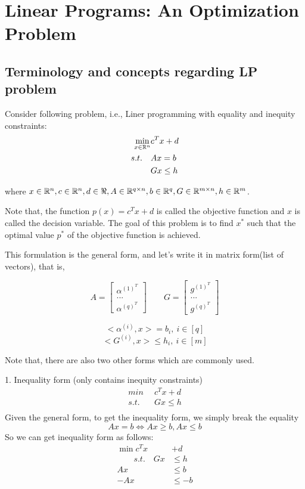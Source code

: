 
\section{Linear Programs: An Optimization Problem}
\subsection{Terminology and concepts regarding LP problem}
Consider following problem, i.e., Liner programming with equality and inequity constraints:
\begin{align*}
	\min_{x\in \mathbb{R}^n}& c^Tx + d\\
	s.t. \quad &Ax = b\\
	&Gx \leq h
\end{align*}

where $x\in \mathbb{R}^n, c\in \mathbb{R}^n, d\in \Re, A\in \mathbb{R}^{q\times n}, b\in \mathbb{R}^q, G\in \mathbb{R}^{m\times n}, h\in \mathbb{R}^m$.

Note that, the function $p(x)=c^Tx + d$ is called the objective function and $x$ is called the decision variable. The goal of this problem is to find $x^*$ such that the optimal value $p^*$ of the objective function is achieved.

This formulation is the general form, and let's write it in matrix form(list of vectors), that is,

$$
A = 
\begin{bmatrix}
\alpha^{(1)^T}\\
...\\
\alpha^{(q)^T}
\end{bmatrix}
\qquad	
G = 
\begin{bmatrix}
g^{(1)^T}\\
...\\
g^{(q)^T}
\end{bmatrix}
$$

$$<\alpha^{(i)}, x> =b_i,\ i\in \left[q\right]$$
$$<G^{(i)}, x>\leq h_i,\ i\in \left[m\right]$$

Note that, there are also two other forms which are commonly used.

1. Inequality form (only contains inequity constraints)
\begin{align*}
	min \,\,\, &c^Tx+d\\
	s.t. \,\,\, &Gx\leq h\\
\end{align*}
Given the general form, to get the inequality form, we simply break the equality
\begin{equation*}
	Ax = b \Leftrightarrow Ax\geq b, Ax\leq b
\end{equation*}
So we can get inequality form as follows:
\begin{align*}
	\min c^Tx&+d\\
	\qquad s.t. \quad Gx &\leq h\\
	Ax &\leq b\\
	-Ax &\leq -b
\end{align*}

